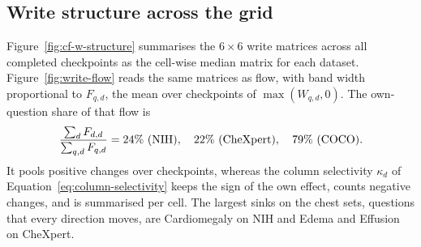 \documentclass{article}
\begin{document}
\begin{table}[htbp]
\centering
\setlength{\tabcolsep}{8pt}
\caption{\textbf{Difficulty matching.} Per matching variable: matched chest cells, natural-image partner cells, and the pooled and matched differences of Equation~\ref{eq:matching} with 95\% cluster-bootstrap intervals over models.}
\label{tab:cf-matching}
\end{table}

\subsection{Write structure across the grid}
\label{app:cf-figures}

Figure~\ref{fig:cf-w-structure} summarises the $6\times6$ write matrices across all completed checkpoints as the cell-wise median matrix for each dataset. Figure~\ref{fig:write-flow} reads the same matrices as flow, with band width proportional to $F_{q,d}$, the mean over checkpoints of $\max(W_{q,d},0)$. The own-question share of that flow is
\begin{equation}
\frac{\sum_d F_{d,d}}{\sum_{q,d}F_{q,d}}=24\%\ \text{(NIH)},\quad 22\%\ \text{(CheXpert)},\quad 79\%\ \text{(COCO)}.
\label{eq:flow-share}
\end{equation}
It pools positive changes over checkpoints, whereas the column selectivity $\kappa_d$ of Equation~\ref{eq:column-selectivity} keeps the sign of the own effect, counts negative changes, and is summarised per cell. The largest sinks on the chest sets, questions that every direction moves, are Cardiomegaly on NIH and Edema and Effusion on CheXpert.
\end{document}
